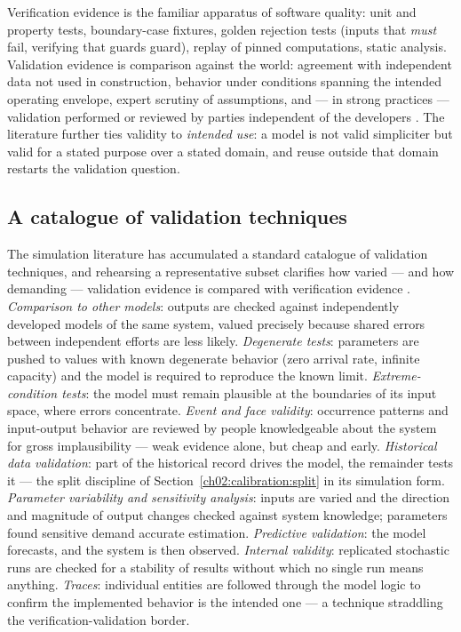 Verification evidence is the familiar apparatus of software quality: unit and property tests, boundary-case fixtures, golden rejection tests (inputs that \emph{must} fail, verifying that guards guard), replay of pinned computations, static analysis. Validation evidence is comparison against the world: agreement with independent data not used in construction, behavior under conditions spanning the intended operating envelope, expert scrutiny of assumptions, and --- in strong practices --- validation performed or reviewed by parties independent of the developers \cite{sargent}. The literature further ties validity to \emph{intended use}: a model is not valid simpliciter but valid for a stated purpose over a stated domain, and reuse outside that domain restarts the validation question.

\subsection{A catalogue of validation techniques}\label{ch02:vv:techniques}

The simulation literature has accumulated a standard catalogue of validation techniques, and rehearsing a representative subset clarifies how varied --- and how demanding --- validation evidence is compared with verification evidence \cite{sargent}. \emph{Comparison to other models}: outputs are checked against independently developed models of the same system, valued precisely because shared errors between independent efforts are less likely. \emph{Degenerate tests}: parameters are pushed to values with known degenerate behavior (zero arrival rate, infinite capacity) and the model is required to reproduce the known limit. \emph{Extreme-condition tests}: the model must remain plausible at the boundaries of its input space, where errors concentrate. \emph{Event and face validity}: occurrence patterns and input-output behavior are reviewed by people knowledgeable about the system for gross implausibility --- weak evidence alone, but cheap and early. \emph{Historical data validation}: part of the historical record drives the model, the remainder tests it --- the split discipline of Section~\ref{ch02:calibration:split} in its simulation form. \emph{Parameter variability and sensitivity analysis}: inputs are varied and the direction and magnitude of output changes checked against system knowledge; parameters found sensitive demand accurate estimation. \emph{Predictive validation}: the model forecasts, and the system is then observed. \emph{Internal validity}: replicated stochastic runs are checked for a stability of results without which no single run means anything. \emph{Traces}: individual entities are followed through the model logic to confirm the implemented behavior is the intended one --- a technique straddling the verification-validation border.

